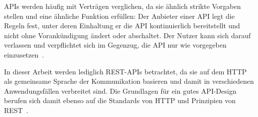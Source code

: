 \acp{API} werden häufig mit Verträgen verglichen, da sie ähnlich strikte Vorgaben stellen und eine ähnliche Funktion erfüllen:
Der Anbieter einer \ac{API} legt die Regeln fest, unter deren Einhaltung er die \ac{API} kontinuierlich bereitstellt und nicht ohne Vorankündigung ändert oder abschaltet.
Der Nutzer kann sich darauf verlassen und verpflichtet sich im Gegenzug, die \ac{API} nur wie vorgegeben einzusetzen~\cites[1627]{cha21}{ope23a}.

In dieser Arbeit werden lediglich \ac{REST}-\acp{API} betrachtet, da sie auf dem \ac{HTTP} als gemeinsame Sprache der Kommunikation basieren und damit in verschiedenen Anwendungsfällen verbreitet sind.
Die Grundlagen für ein gutes \ac{API}-Design berufen sich damit ebenso auf die Standards von \ac{HTTP} und Prinzipien von \ac{REST}~\cite[1628]{cha21}.